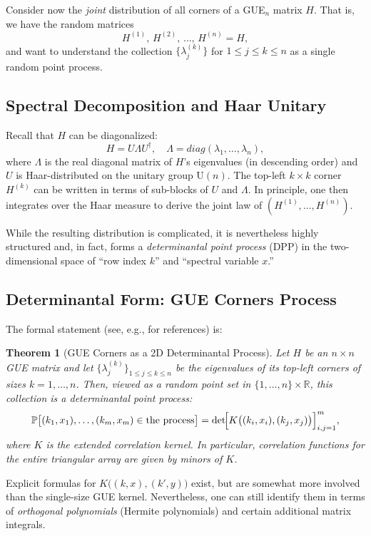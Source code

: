 \documentclass[letterpaper,11pt,oneside,reqno]{article}
\numberwithin{equation}{section}
\newtheorem{theorem}[proposition]{Theorem}
\theoremstyle{definition}
\begin{document}
Consider now the \emph{joint} distribution of all corners of a GUE$_n$ matrix $H$. That is, we have the random matrices
\[
	H^{(1)},\,H^{(2)},\,\dots,\,H^{(n)}=H,
\]
and want to understand the collection $\{\lambda_j^{(k)}\}$ for $1\le j\le k\le n$ as a single random point process. 

\subsection{Spectral Decomposition and Haar Unitary}
Recall that $H$ can be diagonalized:
\[
	H = U \Lambda U^\dagger,
	\quad
	\Lambda = diag(\lambda_1,\dots,\lambda_n),
\]
where $\Lambda$ is the real diagonal matrix of $H$'s eigenvalues (in descending order) and $U$ is Haar-distributed on the unitary group $\mathrm{U}(n)$. The top-left $k\times k$ corner $H^{(k)}$ can be written in terms of sub-blocks of $U$ and $\Lambda$. In principle, one then integrates over the Haar measure to derive the joint law of $(H^{(1)},\dots,H^{(n)})$. 

While the resulting distribution is complicated, it is nevertheless highly structured and, in fact, forms a \emph{determinantal point process} (DPP) in the two-dimensional space of ``row index $k$'' and ``spectral variable $x$.'' 

\subsection{Determinantal Form: GUE Corners Process}
The formal statement (see, e.g., \cite{Johansson-2005,Johansson-2006,baryshnikov2001gues,forrester2010log} for references) is:

\begin{theorem}[GUE Corners as a 2D Determinantal Process]
\label{thm:gue-corners-det}
Let $H$ be an $n\times n$ GUE matrix and let $\{\lambda_j^{(k)}\}_{1\le j\le k\le n}$ be the eigenvalues of its top-left corners of sizes $k=1,\dots,n$. Then, viewed as a random point set in $\{1,\dots,n\}\times\mathbb{R}$, this collection is a \emph{determinantal point process}:
\[
	\mathbb{P}\bigl[(k_1,x_1),\dots,(k_m,x_m)\in \text{the process}\bigr]
	= \det\!\Bigl[K\bigl((k_i,x_i),(k_j,x_j)\bigr)\Bigr]_{i,j=1}^m,
\]
where $K$ is the \emph{extended correlation kernel}. In particular, correlation functions for the entire triangular array are given by minors of $K$. 
\end{theorem}

Explicit formulas for $K\bigl((k,x),(k',y)\bigr)$ exist, but are somewhat more involved than the single-size GUE kernel. Nevertheless, one can still identify them in terms of \emph{orthogonal polynomials} (Hermite polynomials) and certain additional matrix integrals. 
\end{document}
